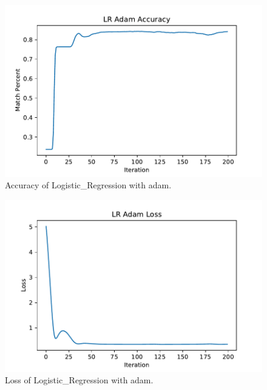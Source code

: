 \documentclass[journal, a4paper]{IEEEtran}
\begin{document}
	\begin{figure}[!hbt]
		\begin{center}
		\includegraphics[width=\columnwidth]{lab2_lr_adam_acc}
		\caption{Accuracy of Logistic\_Regression with adam.}
		\end{center}
	\end{figure}
	\begin{figure}[!hbt]
		\begin{center}
		\includegraphics[width=\columnwidth]{lab2_lr_adam_loss}
		\caption{Loss of Logistic\_Regression with adam.}
		\end{center}
	\end{figure}
	
\end{document}
